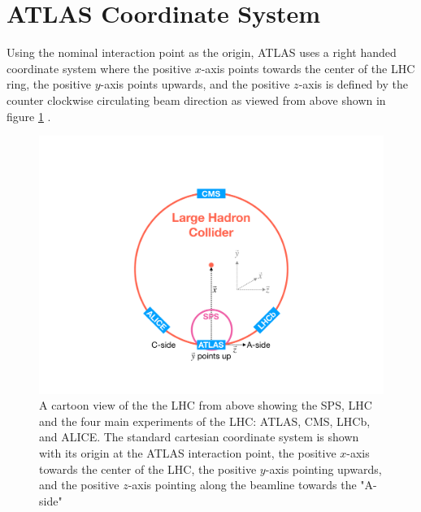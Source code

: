 \section{ATLAS Coordinate System} \label{sec:atlas:coordinates}

Using the nominal interaction point as the origin, ATLAS uses a right handed
coordinate system where the positive $x$-axis points towards the center of the
LHC ring, the positive $y$-axis points upwards, and the positive $z$-axis is
defined by the counter clockwise circulating beam direction as viewed from
above shown in figure \ref{fig:atlas_geometry} \cite{PERF-2007-01}.  
%
\begin{figure}[!htbp]
  \begin{center}
    \includegraphics[width=0.5\linewidth]{figures/atlas/atlas_geometry}
    \caption{ A cartoon view of the the LHC from above showing the SPS, LHC and
the four main experiments of the LHC: ATLAS, CMS, LHCb, and ALICE.  The standard
cartesian coordinate system is shown with its origin at the ATLAS interaction point, the
positive $x$-axis towards the center of the LHC, the positive $y$-axis pointing
upwards, and the positive $z$-axis pointing along the beamline towards the
"A-side"}
    \label{fig:atlas_geometry}
  \end{center}
\end{figure}

